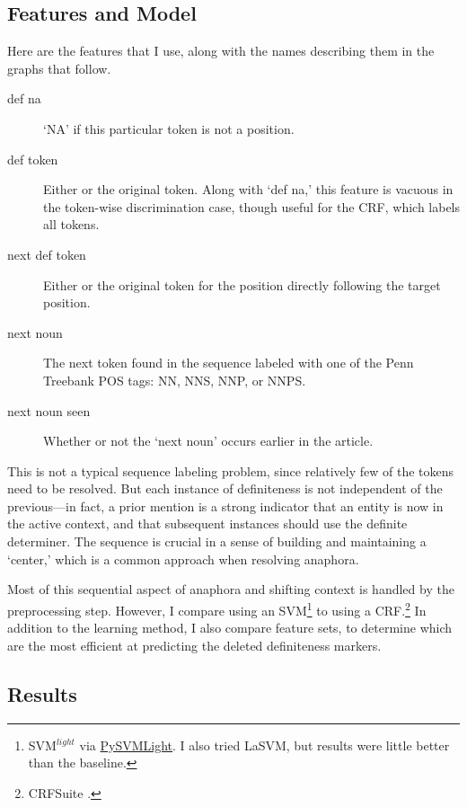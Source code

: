 \documentclass[11pt]{article}\usepackage{graphicx, color}
\begin{document}
\subsection{Features and Model}
Here are the features that I use, along with the names describing them in the graphs that follow.
\begin{description}
  \item[def na] `NA' if this particular token is not a \detplaceholder{} position.
  \item[def token] Either \detplaceholder{} or the original token. Along with `def na,' this feature is vacuous in the token-wise discrimination case, though useful for the CRF, which labels all tokens.
  \item[next def token] Either \detplaceholder{} or the original token for the position directly following the target position.
  \item[next noun] The next token found in the sequence labeled with one of the Penn Treebank POS tags: NN, NNS, NNP, or NNPS.
  \item[next noun seen] Whether or not the `next noun' occurs earlier in the article.
\end{description}

This is not a typical sequence labeling problem, since relatively few of the tokens need to be resolved.
But each instance of definiteness is not independent of the previous---in fact, a prior mention is a strong indicator that an entity is now in the active context, and that subsequent instances should use the definite determiner. The sequence is crucial in a sense of building and maintaining a `center,' which is a common approach when resolving anaphora.

Most of this sequential aspect of anaphora and shifting context is handled by the preprocessing step. However, I compare using an SVM\footnote{SVM$^{light}$ \citep{joachims:1999} via \href{https://bitbucket.org/wcauchois/pysvmlight}{PySVMLight}. I also tried LaSVM, but results were little better than the baseline.} to using a CRF.\footnote{CRFSuite \citep{CRFsuite}.}
In addition to the learning method, I also compare feature sets, to determine which are the most efficient at predicting the deleted definiteness markers.

\subsection{Results}
\end{document}
